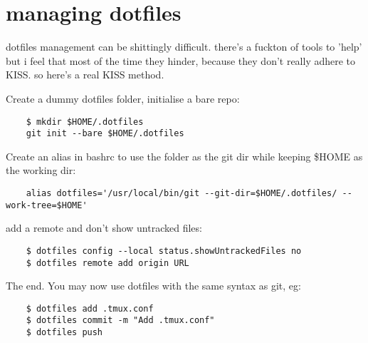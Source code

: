 \section{managing dotfiles}%
\label{sec:managing_dotfiles}

dotfiles management can be shittingly difficult. there's a fuckton of tools  to 'help' but i feel that most of the time they hinder, because they don't really adhere to KISS. so here's a real KISS method.

Create a dummy dotfiles folder, initialise a bare repo:
\begin{verbatim}
	$ mkdir $HOME/.dotfiles
	git init --bare $HOME/.dotfiles
\end{verbatim}

Create an alias in bashrc to use the folder as the git dir while keeping \$HOME as the working dir:
\begin{verbatim}
	alias dotfiles='/usr/local/bin/git --git-dir=$HOME/.dotfiles/ --work-tree=$HOME'
\end{verbatim}

add a remote and don't show untracked files:
\begin{verbatim}
	$ dotfiles config --local status.showUntrackedFiles no
	$ dotfiles remote add origin URL
\end{verbatim}

The end. You may now use dotfiles with the same syntax as git, eg:
\begin{verbatim}
	$ dotfiles add .tmux.conf
	$ dotfiles commit -m "Add .tmux.conf"
	$ dotfiles push
\end{verbatim}
